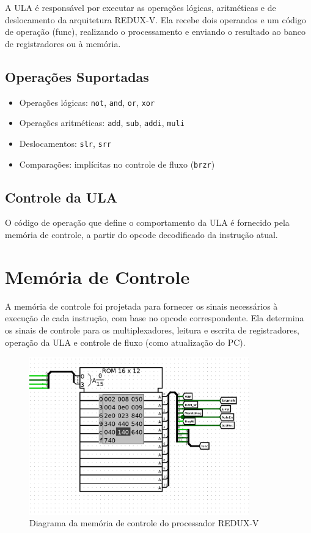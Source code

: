 \documentclass[12pt]{article}
\begin{document}
A ULA é responsável por executar as operações lógicas, aritméticas e de deslocamento da arquitetura REDUX-V. Ela recebe dois operandos e um código de operação (func), realizando o processamento e enviando o resultado ao banco de registradores ou à memória.

\subsection{Operações Suportadas}
\begin{itemize}
  \item Operações lógicas: \texttt{not}, \texttt{and}, \texttt{or}, \texttt{xor}
  \item Operações aritméticas: \texttt{add}, \texttt{sub}, \texttt{addi}, \texttt{muli}
  \item Deslocamentos: \texttt{slr}, \texttt{srr}
  \item Comparações: implícitas no controle de fluxo (\texttt{brzr})
\end{itemize}

\subsection{Controle da ULA}
O código de operação que define o comportamento da ULA é fornecido pela memória de controle, a partir do opcode decodificado da instrução atual.

\section{Memória de Controle}

A memória de controle foi projetada para fornecer os sinais necessários à execução de cada instrução, com base no opcode correspondente. Ela determina os sinais de controle para os multiplexadores, leitura e escrita de registradores, operação da ULA e controle de fluxo (como atualização do PC).

\begin{figure}[H]
\centering
\includegraphics[width=0.85\textwidth]{images/controll_memory.png}
\caption{Diagrama da memória de controle do processador REDUX-V}
\label{fig:memoria_controle}
\end{figure}
\end{document}
